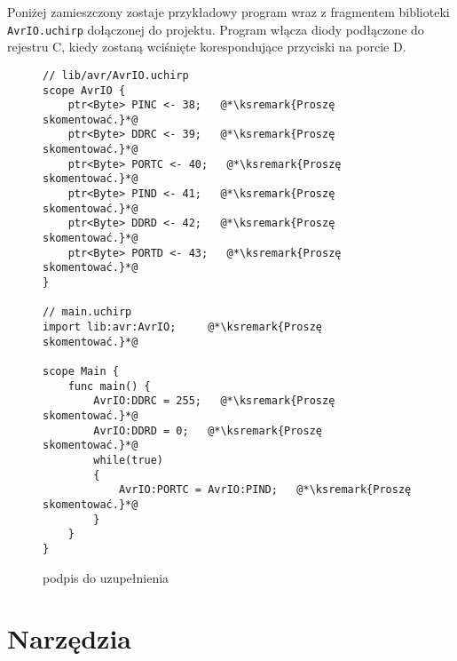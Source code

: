 Poniżej zamieszczony zostaje  przykładowy program wraz z fragmentem biblioteki \lstinline|AvrIO.uchirp| dołączonej do projektu. Program włącza diody podłączone do rejestru C, kiedy zostaną wciśnięte korespondujące przyciski na porcie D.
\begin{figure}
\centering
\begin{lstlisting}
// lib/avr/AvrIO.uchirp
scope AvrIO {
    ptr<Byte> PINC <- 38;   @*\ksremark{Proszę skomentować.}*@
    ptr<Byte> DDRC <- 39;   @*\ksremark{Proszę skomentować.}*@
    ptr<Byte> PORTC <- 40;   @*\ksremark{Proszę skomentować.}*@
    ptr<Byte> PIND <- 41;   @*\ksremark{Proszę skomentować.}*@
    ptr<Byte> DDRD <- 42;   @*\ksremark{Proszę skomentować.}*@
    ptr<Byte> PORTD <- 43;   @*\ksremark{Proszę skomentować.}*@
}

// main.uchirp
import lib:avr:AvrIO;     @*\ksremark{Proszę skomentować.}*@

scope Main {
	func main() {
		AvrIO:DDRC = 255;   @*\ksremark{Proszę skomentować.}*@
		AvrIO:DDRD = 0;   @*\ksremark{Proszę skomentować.}*@
		while(true) 
        {
			AvrIO:PORTC = AvrIO:PIND;	@*\ksremark{Proszę skomentować.}*@
		}
	}
}
\end{lstlisting}
\caption{podpis do uzupełnienia}
\label{fig:lst:2}
\end{figure}

\section{Narzędzia}

